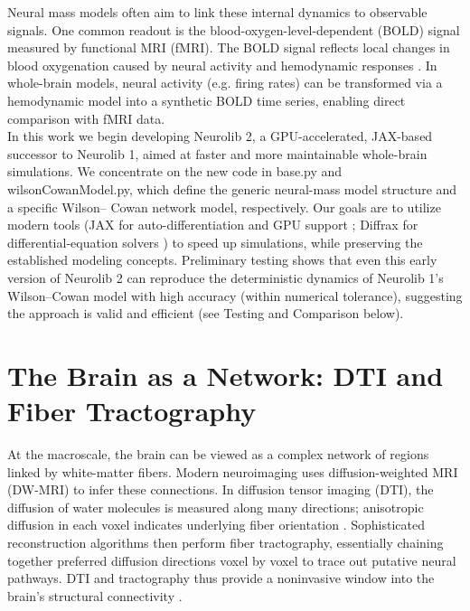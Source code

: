 \documentclass[11pt,a4paper]{article}
\begin{document}
Neural mass models often aim to link these internal dynamics to observable signals. One common readout
is the blood-oxygen-level-dependent (BOLD) signal measured by functional MRI (fMRI). The BOLD signal
reflects local changes in blood oxygenation caused by neural activity and hemodynamic responses \cite{kim2012biophysical}. In
whole-brain models, neural activity (e.g. firing rates) can be transformed via a hemodynamic model into a
synthetic BOLD time series, enabling direct comparison with fMRI data. \\

In this work we begin developing Neurolib 2, a GPU-accelerated, JAX-based successor to Neurolib 1, aimed at
faster and more maintainable whole-brain simulations. We concentrate on the new code in base.py and
wilsonCowanModel.py, which define the generic neural-mass model structure and a specific Wilson–
Cowan network model, respectively. Our goals are to utilize modern tools (JAX for auto-differentiation and
GPU support \cite{kidger2021equinox}; Diffrax for differential-equation solvers \cite{kidger2021neural}) to speed up simulations, while preserving the
established modeling concepts. Preliminary testing shows that even this early version of Neurolib 2 can
reproduce the deterministic dynamics of Neurolib 1’s Wilson–Cowan model with high accuracy (within
numerical tolerance), suggesting the approach is valid and efficient (see Testing and Comparison below).

\section{The Brain as a Network: DTI and Fiber Tractography}



At the macroscale, the brain can be viewed as a complex network of regions linked by white-matter fibers.
Modern neuroimaging uses diffusion-weighted MRI (DW-MRI) to infer these connections. In diffusion
tensor imaging (DTI), the diffusion of water molecules is measured along many directions; anisotropic
diffusion in each voxel indicates underlying fiber orientation \cite{mukherjee2023diffusion}. Sophisticated reconstruction algorithms then
perform fiber tractography, essentially chaining together preferred diffusion directions voxel by voxel to
trace out putative neural pathways. DTI and tractography thus provide a noninvasive window into the
brain’s structural connectivity \cite{mukherjee2023diffusion}.\\
\end{document}
